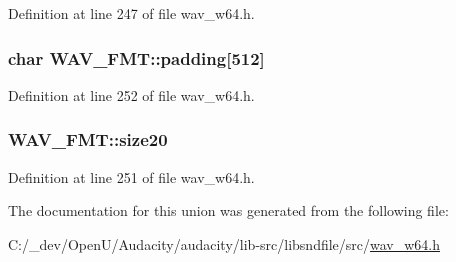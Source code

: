 Definition at line 247 of file wav\+\_\+w64.\+h.

\subsubsection[{\texorpdfstring{padding}{padding}}]{\setlength{\rightskip}{0pt plus 5cm}char W\+A\+V\+\_\+\+F\+M\+T\+::padding\mbox{[}512\mbox{]}}\hypertarget{union_w_a_v___f_m_t_ad2e0b84ff76b1a86e72dcd8357b744ad}{}\label{union_w_a_v___f_m_t_ad2e0b84ff76b1a86e72dcd8357b744ad}


Definition at line 252 of file wav\+\_\+w64.\+h.

\subsubsection[{\texorpdfstring{size20}{size20}}]{ W\+A\+V\+\_\+\+F\+M\+T\+::size20}\hypertarget{union_w_a_v___f_m_t_aa88961cd21455e36b9d20df708be2832}{}\label{union_w_a_v___f_m_t_aa88961cd21455e36b9d20df708be2832}


Definition at line 251 of file wav\+\_\+w64.\+h.



The documentation for this union was generated from the following file\+:\begin{DoxyCompactItemize}
\item 
C\+:/\+\_\+dev/\+Open\+U/\+Audacity/audacity/lib-\/src/libsndfile/src/\hyperlink{wav__w64_8h}{wav\+\_\+w64.\+h}\end{DoxyCompactItemize}
